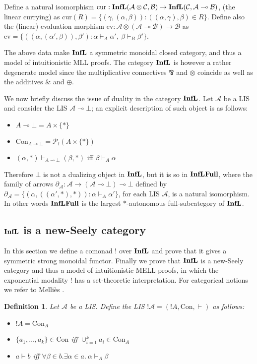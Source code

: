 \documentclass[copyright,creativecommons]{eptcs}
\newtheorem{definition}[theorem]{Definition}
\newcommand{\cA}{\mathcal{A}}
\newcommand{\cB}{\mathcal{B}}
\newcommand{\cC}{\mathcal{C}}
\newcommand{\cP}{\mathcal{P}}
\newcommand{\ga}{\alpha}
\newcommand{\gb}{\beta}
\newcommand{\gc}{\gamma}
\newcommand{\rf}{\mathrm{f}}
\newcommand\ev{\mathrm{ev}}
\newcommand\cur{\mathrm{cur}}
\newcommand{\Con}{\mathrm{Con}} \newcommand{\Com}{\mathrm{Com}} \newcommand{\Sup}{\mathrm{Sup}} %
\begin{document}
Define a natural isomorphism $\cur: \Infl(\cA \otimes \cC, \cB) \to \Infl(\cC, \cA \multimap \cB)$, (the linear currying) as $\cur(R) = \{(\gc, (\ga, \gb)) : ((\ga, \gc), \gb) \in R \}$. Define also the (linear) evaluation morphism \mbox{$\ev: \cA \otimes (\cA \multimap \cB) \to \cB$} as \mbox{$\ev = \{((\ga,(\ga',\gb)),\gb') : \ga \vdash_A \ga',\ \gb \vdash_B \gb' \}$}.

The above data make $\mathbf{InfL}$ a symmetric monoidal closed category, and thus a model of intuitionistic MLL proofs. The category $\mathbf{InfL}$ is however a rather degenerate model since the multiplicative connectives $\bindnasrepma$ and $\otimes$ coincide as well as the additives $\binampersand$ and $\oplus$.

\medskip

We now briefly discuss the issue of duality in the category $\mathbf{InfL}$. Let $\cA$ be a LIS and consider the LIS $\cA \multimap \bot$; an explicit description of such object is as follows: 
\begin{itemize}
\item $A \multimap \bot = A \times \{\ast\}$
\item $\Con_{A \multimap \bot} = \cP_\rf(A \times \{\ast\})$
\item $(\ga, \ast) \vdash_{A \multimap \bot} (\gb, \ast)$ iff $\gb \vdash_A \ga$
\end{itemize}

Therefore $\bot$ is not a dualizing object in $\mathbf{InfL}$, but it is so in $\mathbf{InfLFull}$, where the family of arrows $\partial_\cA: \cA \to (\cA \multimap \bot) \multimap \bot$ defined by $\partial_\cA = \{(\ga,((\ga',\ast),\ast)) : \ga \vdash_A \ga'\}$, for each LIS $\cA$, is a natural isomorphism. In other words $\mathbf{InfLFull}$ is the largest $\ast$-autonomous full-subcategory of $\mathbf{InfL}$.

\subsection{$\mathbf{InfL}$ is a new-Seely category}

In this section we define a comonad $!$ over $\mathbf{InfL}$ and prove that it gives a symmetric strong monoidal functor. Finally we prove that $\mathbf{InfL}$ is a new-Seely category and thus a model of intuitionistic MELL proofs, in which the exponential modality $!$ has a set-theoretic interpretation. For categorical notions we refer to Melli\`{e}s \cite{Mellies}.

\begin{definition}
Let $\cA$ be a LIS. Define the LIS $! \cA = (! A, \Con, \vdash)$ as follows:
\begin{itemize}
\item $! A = \Con_A$
\item $\{a_1, \ldots, a_k\} \in \Con$ iff $\cup_{i=1}^{k} a_i \in \Con_A$
\item $a \vdash b$ iff $\forall \gb \in b.\exists \ga \in a.\ \ga \vdash_A \gb$
\end{itemize}
\end{definition} 
\end{document}
